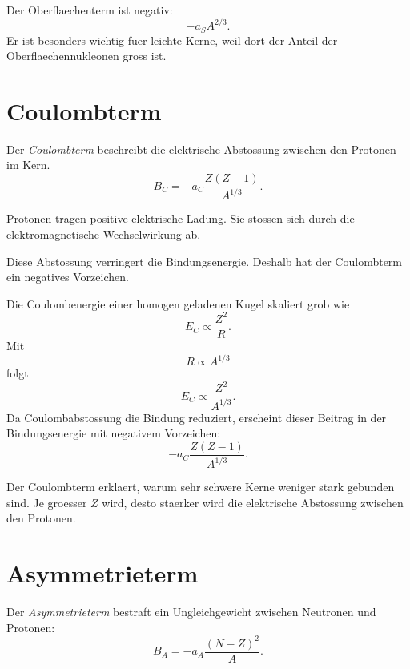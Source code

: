 \begin{examtipbox}
Der Oberflaechenterm ist negativ:
\[
    -a_SA^{2/3}.
\]
Er ist besonders wichtig fuer leichte Kerne, weil dort der Anteil der
Oberflaechennukleonen gross ist.
\end{examtipbox}

\section{Coulombterm}

\begin{definitionbox}
Der \emph{Coulombterm} beschreibt die elektrische Abstossung zwischen den Protonen
im Kern.
\[
    B_C
    =
    -a_C \frac{Z(Z-1)}{A^{1/3}}.
\]
\end{definitionbox}

\begin{conceptbox}
Protonen tragen positive elektrische Ladung.
Sie stossen sich durch die elektromagnetische Wechselwirkung ab.

Diese Abstossung verringert die Bindungsenergie.
Deshalb hat der Coulombterm ein negatives Vorzeichen.
\end{conceptbox}

\begin{derivationbox}
Die Coulombenergie einer homogen geladenen Kugel skaliert grob wie
\[
    E_C \propto \frac{Z^2}{R}.
\]
Mit
\[
    R \propto A^{1/3}
\]
folgt
\[
    E_C \propto \frac{Z^2}{A^{1/3}}.
\]
Da Coulombabstossung die Bindung reduziert, erscheint dieser Beitrag in der
Bindungsenergie mit negativem Vorzeichen:
\[
    -a_C\frac{Z(Z-1)}{A^{1/3}}.
\]
\end{derivationbox}

\begin{conceptbox}
Der Coulombterm erklaert, warum sehr schwere Kerne weniger stark gebunden sind.
Je groesser $Z$ wird, desto staerker wird die elektrische Abstossung zwischen den
Protonen.
\end{conceptbox}

\section{Asymmetrieterm}

\begin{definitionbox}
Der \emph{Asymmetrieterm} bestraft ein Ungleichgewicht zwischen Neutronen und Protonen:
\[
    B_A
    =
    -a_A \frac{(N-Z)^2}{A}.
\]
\end{definitionbox}

